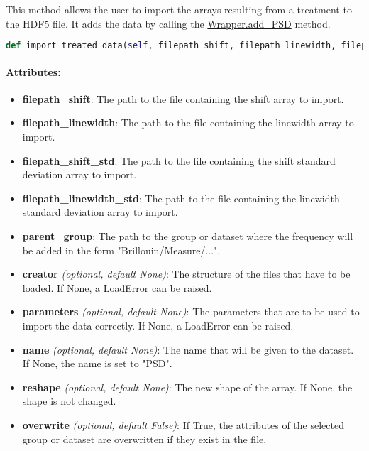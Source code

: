 This method allows the user to import the arrays resulting from a treatment to the HDF5 file. It adds the data by calling the \hyperref[subsec:wrapper.add_psd]{Wrapper.add\_PSD} method.


\begin{lstlisting}[language=Python]
def import_treated_data(self, filepath_shift, filepath_linewidth, filepath_shift_std, filepath_linewidth_std, parent_group, creator = None, parameters = None, name = None, reshape = None, overwrite = False):
\end{lstlisting}

\paragraph{Attributes:}

\begin{itemize}
    \item \textbf{filepath\_shift}: The path to the file containing the shift array to import.
    \item \textbf{filepath\_linewidth}: The path to the file containing the linewidth array to import.
    \item \textbf{filepath\_shift\_std}: The path to the file containing the shift standard deviation array to import.
    \item \textbf{filepath\_linewidth\_std}: The path to the file containing the linewidth standard deviation array to import.
    \item \textbf{parent\_group}: The path to the group or dataset where the frequency will be added in the form "Brillouin/Measure/...".
    \item \textbf{creator} \textit{(optional, default None)}: The structure of the files that have to be loaded. If None, a LoadError can be raised.
    \item \textbf{parameters} \textit{(optional, default None)}: The parameters that are to be used to import the data correctly.  If None, a LoadError can be raised.
    \item \textbf{name} \textit{(optional, default None)}: The name that will be given to the dataset. If None, the name is set to "PSD".
    \item \textbf{reshape} \textit{(optional, default None)}: The new shape of the array. If None, the shape is not changed.
    \item \textbf{overwrite} \textit{(optional, default False)}: If True, the attributes of the selected group or dataset are overwritten if they exist in the file.
\end{itemize}



